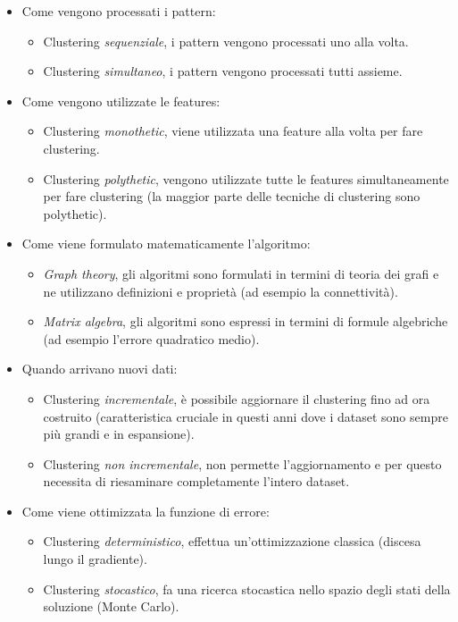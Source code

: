 \documentclass[a4paper,oneside,titlepage]{book}
\begin{document}
\begin{itemize}
\begin{itemize}
    \end{itemize}
    \item Come vengono processati i pattern:
    \begin{itemize}
        \item Clustering \textit{sequenziale}, i pattern vengono processati uno alla volta.
        \item Clustering \textit{simultaneo}, i pattern vengono processati tutti assieme.
    \end{itemize}
    \item Come vengono utilizzate le features:
    \begin{itemize}
        \item Clustering \textit{monothetic}, viene utilizzata una feature alla volta per fare clustering.
        \item Clustering \textit{polythetic}, vengono utilizzate tutte le features simultaneamente per fare clustering (la maggior parte delle tecniche di clustering sono polythetic).
    \end{itemize}
    \item Come viene formulato matematicamente l'algoritmo:
    \begin{itemize}
        \item \textit{Graph theory}, gli algoritmi sono formulati in termini di teoria dei grafi e ne utilizzano definizioni e proprietà (ad esempio la connettività).
        \item \textit{Matrix algebra}, gli algoritmi sono espressi in termini di formule algebriche (ad esempio l'errore quadratico medio).
    \end{itemize}
    \item Quando arrivano nuovi dati:
    \begin{itemize}
        \item Clustering \textit{incrementale}, è possibile aggiornare il clustering fino ad ora costruito (caratteristica cruciale in questi anni dove i dataset sono sempre più grandi e in espansione).
        \item Clustering \textit{non incrementale}, non permette l'aggiornamento e per questo necessita di riesaminare completamente l'intero dataset.
    \end{itemize}
    \item Come viene ottimizzata la funzione di errore:
    \begin{itemize}
        \item Clustering \textit{deterministico}, effettua un'ottimizzazione classica (discesa lungo il gradiente).
        \item Clustering \textit{stocastico}, fa una ricerca stocastica nello spazio degli stati della soluzione (Monte Carlo).
    \end{itemize}
\end{itemize}
\end{document}
